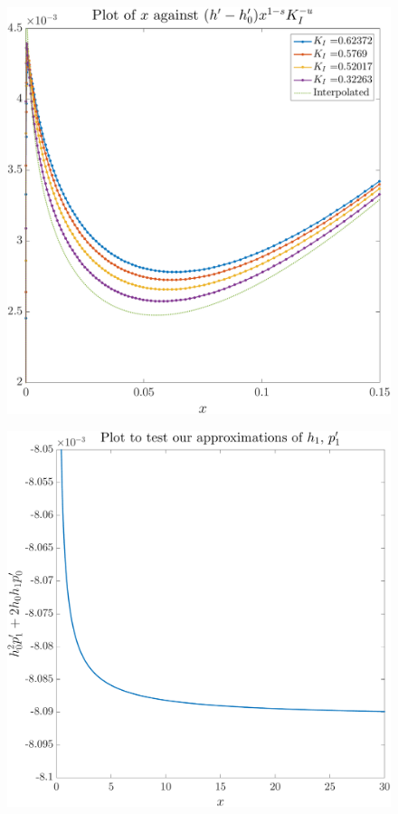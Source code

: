 \documentclass{article}
\begin{document}
\begin{figure}[!ht]\centering
\includegraphics[scale=0.3]{h1-prime.pdf}
\end{figure}
\begin{figure}[!ht]\centering
\includegraphics[scale=0.3]{linear-lubrication.pdf}
\end{figure}
\end{document}
